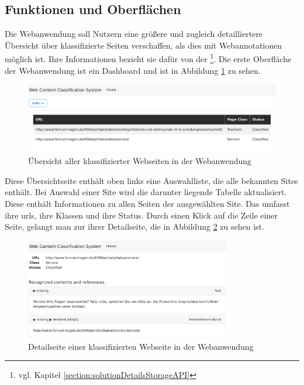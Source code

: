 \subsection{Funktionen und Oberflächen}
    \label{section:solutionDetailsWebAppFunctions}
    Die Webanwendung soll Nutzern eine größere und zugleich detailliertere
    Übersicht über klassifizierte Seiten verschaffen,
    als dies mit Webannotationen möglich ist.
    Ihre Informationen bezieht sie dafür von der
    {\classificationStorageAPI}\footnote{vgl. Kapitel \ref{section:solutionDetailsStorageAPI}}.
    Die erste Oberfläche der Webanwendung ist ein Dashboard
    und ist in Abbildung \ref{image:webAppDashboard} zu sehen.

    \begin{figure}[htb]
        \centering
        \includegraphics[width=\textwidth]{../resources/web-app/dashboard.png}
        \caption{Übersicht aller klassifizierter Webseiten in der Webanwendung}
        \label{image:webAppDashboard}
    \end{figure}

    Diese Übersichtseite enthält oben links eine Auswahlliste, die alle bekannten Sites enthält.
    Bei Auswahl einer Site wird die darunter liegende Tabelle aktualisiert.
    Diese enthält Informationen zu allen Seiten der ausgewählten Site.
    Das umfasst ihre \glspl{url}, ihre Klassen und ihre Status.
    Durch einen Klick auf die Zeile einer Seite,
    gelangt man zur ihrer Detailseite,
    die in Abbildung \ref{image:webAppDetailPage} zu sehen ist.

    \begin{figure}[htb]
        \centering
        \includegraphics[width=0.8\textwidth]{../resources/web-app/detail-page.png}
        \caption{Detailseite einer klassifizierten Webseite in der Webanwendung}
        \label{image:webAppDetailPage}
    \end{figure}

